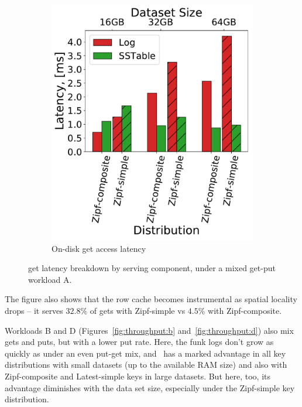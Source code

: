 \begin{figure}[htb]
\begin{subfigure}{0.6\linewidth}
\includegraphics[width=\textwidth]{figs/Latency_A.pdf}
\caption{On-disk get access latency}
\label{fig:readstat:lat}
\end{subfigure}
\caption{{\sys\/ get latency breakdown by serving component, under a mixed get-put workload A.}}
\label{fig:readstat}
\end{figure}

The figure also shows that the row cache becomes instrumental as spatial locality drops -- it serves $32.8\%$ of gets with Zipf-simple 
vs $4.5\%$ with Zipf-composite. 

Workloads B and D (Figures~\ref{fig:throughput:b} and~\ref{fig:throughput:d}) also mix gets and puts, but with a lower put rate. 
Here, the funk logs don't grow as quickly as under an even put-get mix, and 
\sys\  has a marked advantage in all key distributions with small datasets (up to the available RAM size) 
and also with Zipf-composite and Latest-simple keys in large datasets. But here, too, its advantage diminishes with the data set size,
especially under the Zipf-simple key distribution.  

